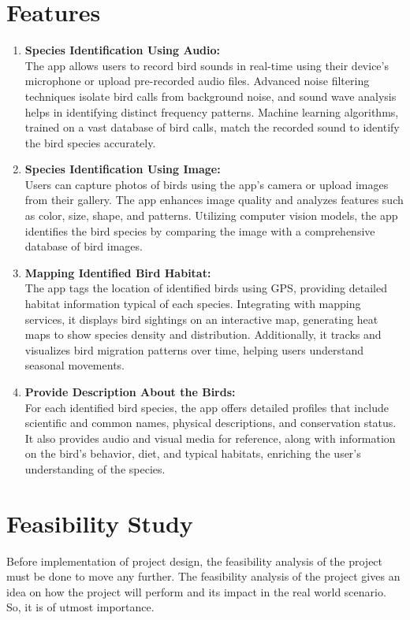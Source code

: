  \section{Features}
 \begin{enumerate}
    \item \textbf{Species Identification Using Audio:}\\
    The app allows users to record bird sounds in real-time using their device's microphone or 
    upload pre-recorded audio files. Advanced noise filtering techniques isolate bird calls from 
    background noise, and sound wave analysis helps in identifying distinct frequency patterns. 
    Machine learning algorithms, trained on a vast database of bird calls, match the recorded 
    sound to identify the bird species accurately.
    
    \item \textbf{Species Identification Using Image:}\\
    Users can capture photos of birds using the app's camera or upload images from their gallery.
    The app enhances image quality and analyzes features such as color, size, shape, and patterns. 
    Utilizing computer vision models, the app identifies the bird species by comparing the image 
    with a comprehensive database of bird images.
    
    \item \textbf{Mapping Identified Bird Habitat:}\\
    The app tags the location of identified birds using GPS, providing detailed habitat information 
    typical of each species. Integrating with mapping services, it displays bird sightings on an 
    interactive map, generating heat maps to show species density and distribution. Additionally, 
    it tracks and visualizes bird migration patterns over time, helping users understand seasonal
    movements.
    
    \item \textbf{Provide Description About the Birds:}\\
    For each identified bird species, the app offers detailed profiles that include scientific and 
    common names, physical descriptions, and conservation status. It also provides audio and visual 
    media for reference, along with information on the bird's behavior, diet, and typical habitats, 
    enriching the user's understanding of the species.
    
 \end{enumerate}
 \section{Feasibility Study}
Before implementation of project design, the feasibility analysis of the project must be
done to move any further. The feasibility analysis of the project gives an idea on how the
project will perform and its impact in the real world scenario. So, it is of utmost
importance.
